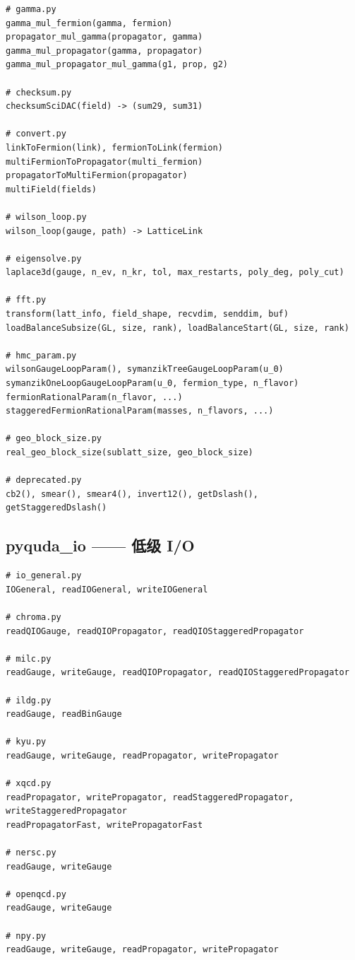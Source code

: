 \documentclass[12pt,a4paper]{ctexart}
\begin{document}
\begin{lstlisting}[style=pycode]
# gamma.py
gamma_mul_fermion(gamma, fermion)
propagator_mul_gamma(propagator, gamma)
gamma_mul_propagator(gamma, propagator)
gamma_mul_propagator_mul_gamma(g1, prop, g2)

# checksum.py
checksumSciDAC(field) -> (sum29, sum31)

# convert.py
linkToFermion(link), fermionToLink(fermion)
multiFermionToPropagator(multi_fermion)
propagatorToMultiFermion(propagator)
multiField(fields)

# wilson_loop.py
wilson_loop(gauge, path) -> LatticeLink

# eigensolve.py
laplace3d(gauge, n_ev, n_kr, tol, max_restarts, poly_deg, poly_cut)

# fft.py
transform(latt_info, field_shape, recvdim, senddim, buf)
loadBalanceSubsize(GL, size, rank), loadBalanceStart(GL, size, rank)

# hmc_param.py
wilsonGaugeLoopParam(), symanzikTreeGaugeLoopParam(u_0)
symanzikOneLoopGaugeLoopParam(u_0, fermion_type, n_flavor)
fermionRationalParam(n_flavor, ...)
staggeredFermionRationalParam(masses, n_flavors, ...)

# geo_block_size.py
real_geo_block_size(sublatt_size, geo_block_size)

# deprecated.py
cb2(), smear(), smear4(), invert12(), getDslash(), getStaggeredDslash()
\end{lstlisting}

\subsection{pyquda\_io —— 低级 I/O}

\begin{lstlisting}[style=pycode]
# io_general.py
IOGeneral, readIOGeneral, writeIOGeneral

# chroma.py
readQIOGauge, readQIOPropagator, readQIOStaggeredPropagator

# milc.py
readGauge, writeGauge, readQIOPropagator, readQIOStaggeredPropagator

# ildg.py
readGauge, readBinGauge

# kyu.py
readGauge, writeGauge, readPropagator, writePropagator

# xqcd.py
readPropagator, writePropagator, readStaggeredPropagator, writeStaggeredPropagator
readPropagatorFast, writePropagatorFast

# nersc.py
readGauge, writeGauge

# openqcd.py
readGauge, writeGauge

# npy.py
readGauge, writeGauge, readPropagator, writePropagator
\end{lstlisting}
\end{document}
